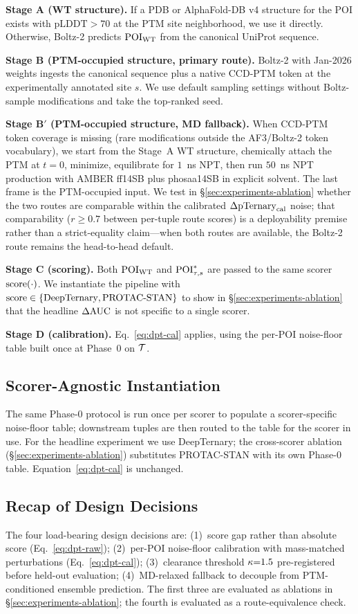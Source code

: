 \textbf{Stage A (WT structure).} If a PDB or AlphaFold-DB v4 structure for the POI exists with $\mathrm{pLDDT} > 70$ at the PTM site neighborhood, we use it directly. Otherwise, Boltz-2 predicts $\mathrm{POI}_{\mathrm{WT}}$ from the canonical UniProt sequence.

\textbf{Stage B (PTM-occupied structure, primary route).} Boltz-2 with Jan-2026 weights ingests the canonical sequence plus a native CCD-PTM token at the experimentally annotated site $s$. We use default sampling settings without Boltz-sample modifications and take the top-ranked seed.

\textbf{Stage B$'$ (PTM-occupied structure, MD fallback).} When CCD-PTM token coverage is missing (rare modifications outside the AF3/Boltz-2 token vocabulary), we start from the Stage~A WT structure, chemically attach the PTM at $t{=}0$, minimize, equilibrate for $1$~ns NPT, then run $50$~ns NPT production with AMBER ff14SB plus phosaa14SB in explicit solvent. The last frame is the PTM-occupied input. We test in \S\ref{sec:experiments-ablation} whether the two routes are comparable within the calibrated $\Delta\mathrm{pTernary}_{\mathrm{cal}}$ noise; that comparability ($r{\geq}0.7$ between per-tuple route scores) is a deployability premise rather than a strict-equality claim---when both routes are available, the Boltz-2 route remains the head-to-head default.

\textbf{Stage C (scoring).} Both $\mathrm{POI}_{\mathrm{WT}}$ and $\mathrm{POI}^{*}_{\tau,s}$ are passed to the same scorer $\mathrm{score}(\cdot)$. We instantiate the pipeline with $\mathrm{score} \in \{\text{DeepTernary}, \text{PROTAC-STAN}\}$ to show in \S\ref{sec:experiments-ablation} that the headline $\Delta\mathrm{AUC}$ is not specific to a single scorer.

\textbf{Stage D (calibration).} Eq.~\ref{eq:dpt-cal} applies, using the per-POI noise-floor table built once at Phase~0 on $\mathcal{T}$.

\subsection{Scorer-Agnostic Instantiation}
\label{sec:method-scorers}

The same Phase-0 protocol is run once per scorer to populate a scorer-specific noise-floor table; downstream tuples are then routed to the table for the scorer in use. For the headline experiment we use DeepTernary; the cross-scorer ablation (\S\ref{sec:experiments-ablation}) substitutes PROTAC-STAN with its own Phase-0 table. Equation~\ref{eq:dpt-cal} is unchanged.

\subsection{Recap of Design Decisions}
\label{sec:method-recap}

The four load-bearing design decisions are: (1)~score gap rather than absolute score (Eq.~\ref{eq:dpt-raw}); (2)~per-POI noise-floor calibration with mass-matched perturbations (Eq.~\ref{eq:dpt-cal}); (3)~clearance threshold $\kappa{=}1.5$ pre-registered before held-out evaluation; (4)~MD-relaxed fallback to decouple from PTM-conditioned ensemble prediction. The first three are evaluated as ablations in \S\ref{sec:experiments-ablation}; the fourth is evaluated as a route-equivalence check.
